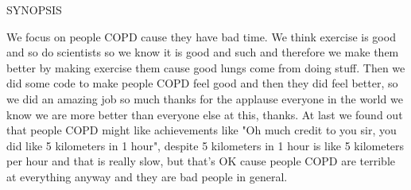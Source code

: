 SYNOPSIS

We focus on people COPD cause they have bad time. We think exercise is good and so do scientists so we know it is good and such and therefore we make them better by making exercise them cause good lungs come from doing stuff. Then we did some code to make people COPD feel good and then they did feel better, so we did an amazing job so much thanks for the applause everyone in the world we know we are more better than everyone else at this, thanks. At last we found out that people COPD might like achievements like "Oh much credit to you sir, you did like 5 kilometers in 1 hour", despite 5 kilometers in 1 hour is like 5 kilometers per hour and that is really slow, but that's OK cause people COPD are terrible at everything anyway and they are bad people in general. 